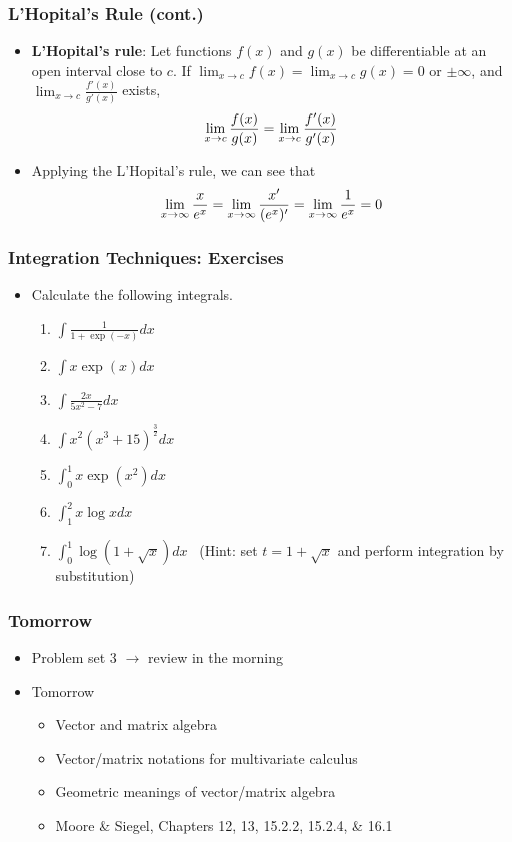 \documentclass[pdflatex, 12pt]{beamer}
\begin{document}
\begin{frame}
\frametitle{L'Hopital's Rule (cont.)}
\begin{itemize}
\item \textbf{L'Hopital's rule}: Let functions $f(x)$ and $g(x)$ be differentiable at an open interval close to $c$. If $\lim_{x \to c} f(x) = \lim_{x \to c} g(x) = 0$ or $\pm\infty$, and $\lim_{x \to c} \frac{f'(x)}{g'(x)}$ exists,
 \begin{equation}
 \lim_{x \to c} \frac{f(x)}{g(x)} = \lim_{x \to c} \frac{f'(x)}{g'(x)} \notag 
 \end{equation} 
\vspace{0.1cm}
\item Applying the L'Hopital's rule, we can see that
 \begin{equation}
 \lim_{x \to \infty} \frac{x}{e^x} = \lim_{x \to \infty} \frac{x'}{(e^x)'} = \lim_{x \to \infty} \frac{1}{e^x} = 0 \notag 
 \end{equation} 
\end{itemize}
\end{frame}

\begin{frame}
\frametitle{Integration Techniques: Exercises}
\begin{itemize}
\item Calculate the following integrals.
 \begin{enumerate}
 \item $\int \frac{1}{1 + \exp(-x)} dx$
 \vspace{0.1cm}
 \item $\int x\exp(x) dx$
 \vspace{0.1cm}
 \item $\int \frac{2x}{5 x^2 - 7} dx$
 \vspace{0.1cm}
 \item $\int x^2 (x^3 + 15)^{\frac{3}{2}} dx$
 \item $\int^1_0 x\exp(x^2)dx$
 \item $\int^2_1 x\log x dx$
 \item $\int^1_0 \log (1 + \sqrt{x})dx$ \ (Hint: set $t = 1 + \sqrt{x}$ and perform integration by substitution)
 \end{enumerate}
\end{itemize}
\end{frame}

\begin{frame}
\frametitle{Tomorrow}
\begin{itemize}
\item Problem set 3 $\rightarrow$ review in the morning
\vspace{0.4cm}
\item Tomorrow
 \begin{itemize}
 \item Vector and matrix algebra
 \item Vector/matrix notations for multivariate calculus
 \item Geometric meanings of vector/matrix algebra
 \item Moore \& Siegel, Chapters 12, 13, 15.2.2, 15.2.4, \& 16.1
 \end{itemize}
\end{itemize}
\end{frame}
\end{document}
